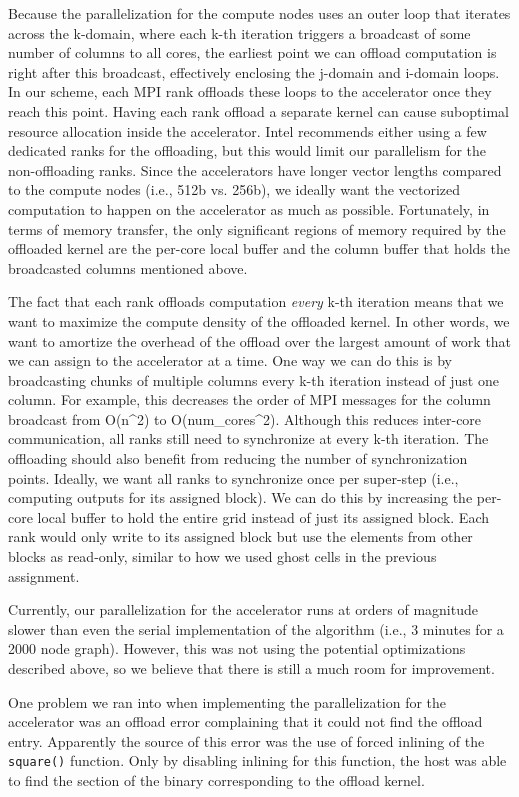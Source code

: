 Because the parallelization for the compute nodes uses an outer loop that
iterates across the k-domain, where each k-th iteration triggers a
broadcast of some number of columns to all cores, the earliest point we
can offload computation is right after this broadcast, effectively
enclosing the j-domain and i-domain loops. In our scheme, each MPI rank
offloads these loops to the accelerator once they reach this
point. Having each rank offload a separate kernel can cause suboptimal
resource allocation inside the accelerator. Intel recommends either using
a few dedicated ranks for the offloading, but this would limit our
parallelism for the non-offloading ranks. Since the accelerators have
longer vector lengths compared to the compute nodes (i.e., 512b
vs. 256b), we ideally want the vectorized computation to happen on the
accelerator as much as possible. Fortunately, in terms of memory
transfer, the only significant regions of memory required by the
offloaded kernel are the per-core local buffer and the column buffer that
holds the broadcasted columns mentioned above.

The fact that each rank offloads computation \emph{every} k-th iteration
means that we want to maximize the compute density of the offloaded
kernel. In other words, we want to amortize the overhead of the offload
over the largest amount of work that we can assign to the accelerator at
a time. One way we can do this is by broadcasting chunks of multiple
columns every k-th iteration instead of just one column. For example,
this decreases the order of MPI messages for the column broadcast from
O(n^2) to O(num\_cores^2). Although this reduces inter-core
communication, all ranks still need to synchronize at every k-th
iteration. The offloading should also benefit from reducing the number of
synchronization points. Ideally, we want all ranks to synchronize once
per super-step (i.e., computing outputs for its assigned block). We can
do this by increasing the per-core local buffer to hold the entire grid
instead of just its assigned block. Each rank would only write to its
assigned block but use the elements from other blocks as read-only,
similar to how we used ghost cells in the previous assignment.

Currently, our parallelization for the accelerator runs at orders of
magnitude slower than even the serial implementation of the algorithm
(i.e., 3 minutes for a 2000 node graph). However, this was not using the
potential optimizations described above, so we believe that there is
still a much room for improvement.

One problem we ran into when implementing the parallelization for the
accelerator was an offload error complaining that it could not find the
offload entry. Apparently the source of this error was the use of forced
inlining of the \texttt{square()} function. Only by disabling inlining
for this function, the host was able to find the section of the binary
corresponding to the offload kernel.
